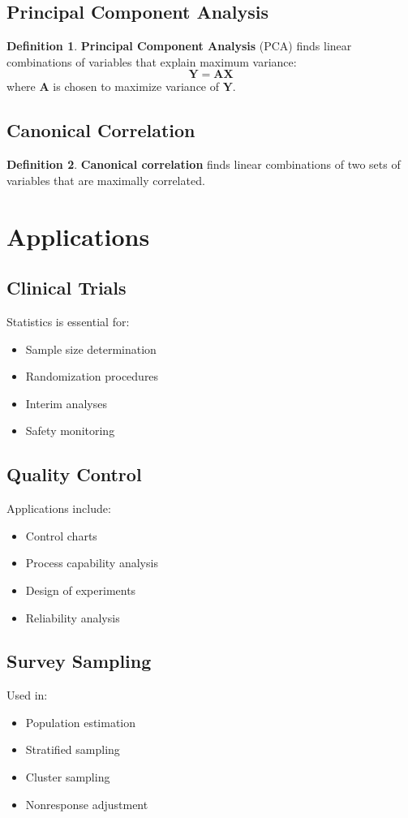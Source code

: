 \documentclass[11pt]{article}
\theoremstyle{definition}
\newtheorem{definition}{Definition}[section]
\begin{document}
\subsection{Principal Component Analysis}
\begin{definition}
\textbf{Principal Component Analysis} (PCA) finds linear combinations of variables that explain maximum variance:
$$\mathbf{Y} = \mathbf{A}\mathbf{X}$$
where $\mathbf{A}$ is chosen to maximize variance of $\mathbf{Y}$.
\end{definition}

\subsection{Canonical Correlation}
\begin{definition}
\textbf{Canonical correlation} finds linear combinations of two sets of variables that are maximally correlated.
\end{definition}

\section{Applications}

\subsection{Clinical Trials}
Statistics is essential for:
\begin{itemize}
    \item Sample size determination
    \item Randomization procedures
    \item Interim analyses
    \item Safety monitoring
\end{itemize}

\subsection{Quality Control}
Applications include:
\begin{itemize}
    \item Control charts
    \item Process capability analysis
    \item Design of experiments
    \item Reliability analysis
\end{itemize}

\subsection{Survey Sampling}
Used in:
\begin{itemize}
    \item Population estimation
    \item Stratified sampling
    \item Cluster sampling
    \item Nonresponse adjustment
\end{itemize}
\end{document}
